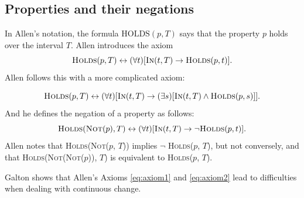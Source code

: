 \subsection{Properties and their negations}
In Allen's notation, the formula $\text{HOLDS}(p, T)$ says that the property $p$ holds over the interval $T$.
Allen introduces the axiom
\begin{equation}
	\textsc{Holds}(p, T) \leftrightarrow (\forall t) [\textsc{In}(t, T) \to \textsc{Holds}(p, t)].
\end{equation}
Allen follows this with a more complicated axiom:

\begin{equation}
	\textsc{Holds}(p, T) \leftrightarrow (\forall t) [\textsc{In}(t, T) \to (\exists s)[\textsc{In}(t, T) \land \textsc{Holds}(p, s)]].
	\label{eq:axiom1}
\end{equation}
And he defines the negation of a property as follows:
\begin{equation}
	\textsc{Holds}(\textsc{Not}(p), T) \leftrightarrow (\forall t) [\textsc{In}(t, T) \to \neg \textsc{Holds}(p, t)].
	\label{eq:axiom2}
\end{equation}
Allen notes that \textsc{Holds}(\textsc{Not}($p$, $T$)) implies $\neg$ \textsc{Holds}($p$, $T$), but not conversely, and that \textsc{Holds}(\textsc{Not}(\textsc{Not}($p$)), $T$) is equivalent to \textsc{Holds}($p$, $T$).

Galton shows that Allen's Axioms \ref{eq:axiom1} and \ref{eq:axiom2} lead to difficulties when dealing with continuous change.

